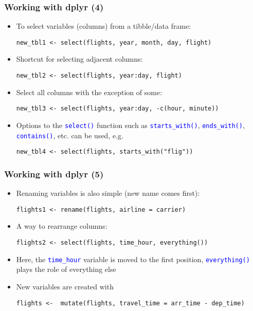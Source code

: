 \documentclass[10pt]{beamer}
\newcommand{\cc}[1]{\texttt{\textcolor{blue}{#1}}}
\theoremstyle{definition}
\begin{document}
\begin{frame}[fragile]
\frametitle{Working with \textbf{dplyr} (4)}
\begin{itemize}
	\item To select variables (columns) from a tibble/data frame:
	\begin{lstlisting}[style = rstyle, breaklines]
	new_tbl1 <- select(flights, year, month, day, flight)	
	\end{lstlisting}
	\item Shortcut for selecting adjacent columns:
	\begin{lstlisting}[style = rstyle, breaklines]
	new_tbl2 <- select(flights, year:day, flight)	
	\end{lstlisting}
	\item Select all columns with the exception of some:
	\begin{lstlisting}[style = rstyle, breaklines]
	new_tbl3 <- select(flights, year:day, -c(hour, minute))
	\end{lstlisting}
	\item Options to the \cc{select()} function such as \cc{starts\_with()}, \cc{ends\_with()}, \cc{contains()}, etc. can be used, e.g.
	\begin{lstlisting}[style = rstyle, breaklines]
	new_tbl4 <- select(flights, starts_with("flig"))
	\end{lstlisting}
\end{itemize}
\end{frame}

\begin{frame}[fragile]
\frametitle{Working with \textbf{dplyr} (5)}
\begin{itemize}
	\item Renaming variables is also simple (new name comes first):
	\begin{lstlisting}[style = rstyle, breaklines]
	flights1 <- rename(flights, airline = carrier)	
	\end{lstlisting}
	\item A way to rearrange columns:
	\begin{lstlisting}[style = rstyle, breaklines]
	flights2 <- select(flights, time_hour, everything())
	\end{lstlisting}
	\item Here, the \cc{time\_hour} variable is moved to the first position, \cc{everything()} plays the role of everything else
	\item New variables are created with
	\begin{lstlisting}[style = rstyle, breaklines]
	flights <- 	mutate(flights, travel_time = arr_time - dep_time)
	\end{lstlisting}
\end{itemize}
\end{frame}
\end{document}
